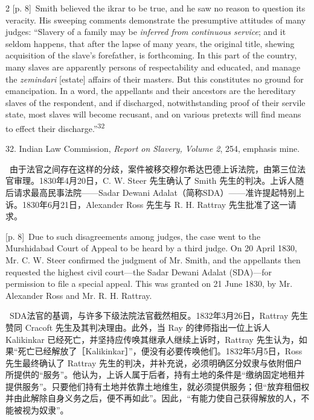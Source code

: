 \documentclass[10pt,a4paper]{article}
\begin{document}
\begin{paracol}{2}
\switchcolumn
{\scriptsize\color{gray} [p. 8]}\ Smith believed the ikrar to be true, and he saw no reason to question its veracity. His sweeping comments demonstrate the presumptive attitudes of many judges: “Slavery of a family may be \textit{inferred from continuous service}; and it seldom happens, that after the lapse of many years, the original title, shewing acquisition of the slave’s forefather, is forthcoming. In this part of the country, many slaves are apparently persons of respectability and educated, and manage the \textit{zemindari} [estate] affairs of their masters. But this constitutes no ground for emancipation. In a word, the appellants and their ancestors are the hereditary slaves of the respondent, and if discharged, notwithstanding proof of their servile state, most slaves will become recusant, and on various pretexts will find means to effect their discharge.”\nobreak\textsuperscript{32}\par{\small 32. Indian Law Commission, \textit{Report on Slavery, Volume 2}, 254, emphasis mine.\par}
\switchcolumn*
{\scriptsize\color{gray} [p. 8]}\ 由于法官之间存在这样的分歧，案件被移交穆尔希达巴德上诉法院，由第三位法官审理。1830年4月20日，C. W. Steer 先生确认了 Smith 先生的判决。上诉人随后请求最高民事法院——Sadar Dewani Adalat（简称SDA）——准许提起特别上诉。1830年6月21日，Alexander Ross 先生与 R. H. Rattray 先生批准了这一请求。\par
\switchcolumn
{\scriptsize\color{gray} [p. 8]}\ Due to such disagreements among judges, the case went to the Murshidabad Court of Appeal to be heard by a third judge. On 20 April 1830, Mr. C. W. Steer confirmed the judgment of Mr. Smith, and the appellants then requested the highest civil court—the Sadar Dewani Adalat (SDA)—for permission to file a special appeal. This was granted on 21 June 1830, by Mr. Alexander Ross and Mr. R. H. Rattray.\par
\switchcolumn*
{\scriptsize\color{gray} [p. 8]}\ SDA法官的基调，与许多下级法院法官截然相反。1832年3月26日，Rattray 先生赞同 Cracoft 先生及其判决理由。此外，当 Ray 的律师指出一位上诉人 Kalikinkar 已经死亡，并坚持应传唤其继承人继续上诉时，Rattray 先生认为，如果“死亡已经解放了［Kalikinkar］”，便没有必要传唤他们。1832年5月5日，Ross 先生最终确认了 Rattray 先生的判决，并补充说，必须明确区分奴隶与依附佃户所提供的“服务”。他认为，上诉人属于后者，持有土地的条件是“缴纳固定地租并提供服务”。只要他们持有土地并依靠土地维生，就必须提供服务；但“放弃租佃权并由此解除自身义务之后，便不再如此”。因此，“有能力使自己获得解放的人，不能被视为奴隶”。\par

\end{paracol}
\end{document}
